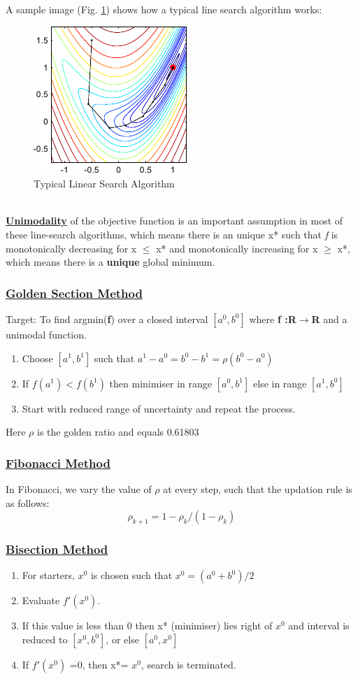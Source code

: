 \documentclass[12pt,a4paper,titlepage]{article}
\begin{document}
A sample image (Fig. \ref{fig1}) shows how a typical line search algorithm works: 
\begin{figure}[h!tb]
	\centering
	\includegraphics[scale=1]{line_searchdemo.png}
	\caption{Typical Linear Search Algorithm} \label{fig1}
\end{figure}
\\
\textbf{\underline{Unimodality}} of the objective function is an important assumption in most of these line-search algorithms, which means there is an unique x* such that \emph{f} is monotonically decreasing for x $\leq$ x* and monotonically increasing for x $\geq$ x*, which means there is a \textbf{unique} global minimum.
\subsubsection{\underline{Golden Section Method}}
Target: To find argmin(\textbf{f}) over a closed interval $[a^0, b^0]$ where \textbf{f :R$\rightarrow$R} and a unimodal function.
\begin{enumerate}
    \item Choose $[a^1, b^1]$ such that $a^1-a^0=b^0-b^1=\rho(b^0-a^0)$
    \item If $f(a^1) < f(b^1)$ then minimiser in range $[a^0, b^1]$ else in range $[a^1,b^0]$
    \item Start with reduced range of uncertainty and repeat the process.
\end{enumerate}
Here $\rho$ is the golden ratio and equals 0.61803
\subsubsection{\underline{Fibonacci Method}}
In Fibonacci, we vary the value of $\rho$ at every step, such that the updation rule is as follows:
\begin{equation}
   \rho_{k+1}= 1- \rho_{k}/(1-\rho_{k})
\end{equation}
\subsubsection{\underline{Bisection Method}}
\begin{enumerate}
    \item For starters, $x^0$ is chosen such that $x^0=(a^0+b^0)/2$
    \item Evaluate $f'(x^0)$.
    \item If this value is less than 0 then x* (minimiser) lies right of $x^0$ and interval is reduced to $[x^0, b^0]$, or else $[a^0, x^0]$ 
    \item If $f'(x^0)$ =0, then x*= $x^0$, search is terminated.
\end{enumerate}
\end{document}
